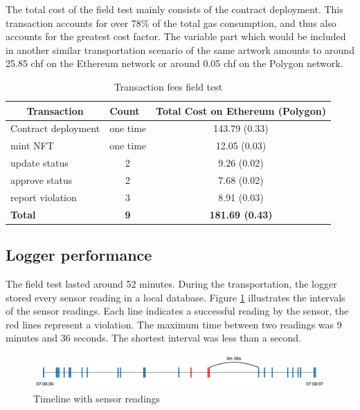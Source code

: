 The total cost of the field test mainly consists of the contract deployment. This transaction accounts for over 78\% of the total gas consumption, and thus also accounts for the greatest cost factor. The variable part which would be included in another similar transportation scenario of the same artwork amounts to around 25.85 \gls{chf} on the Ethereum network or around 0.05 \gls{chf} on the Polygon network.

\begin{table}[ht]
\centering
\begin{tabular}{lcc}
\multicolumn{1}{c}{\textbf{Transaction}} & \multicolumn{1}{l}{\textbf{Count}} & \multicolumn{1}{c}{\textbf{Total Cost on Ethereum (Polygon)}} \\ \hline
Contract deployment                      & one time                           & 143.79 (0.33)          \\
mint NFT                                 & one time                           & 12.05 (0.03)           \\
update status                            & 2                                  & 9.26 (0.02)            \\
approve status                           & 2                                  & 7.68 (0.02)            \\
report violation                         & 3                                  & 8.91 (0.03)            \\ \hline
\textbf{Total}                           & \textbf{9}                         & \textbf{181.69 (0.43)} \\
\hline
\end{tabular}
\caption{Transaction fees field test}
\label{tab:field_test_tx_fees}
\end{table}


\subsection{Logger performance}
The field test lasted around 52 minutes. During the transportation, the logger stored every sensor reading in a local database. Figure \ref{fig:field_test_sensor_readings} illustrates the intervals of the sensor readings. Each line indicates a successful reading by the sensor, the red lines represent a violation. The maximum time between two readings was 9 minutes and 36 seconds. The shortest interval was less than a second.

\begin{figure}[ht]
    \centering
    \includegraphics[width=\textwidth]{diagrams/sensor_eval.drawio.pdf}
    \caption{Timeline with sensor readings}
    \label{fig:field_test_sensor_readings}
\end{figure}

